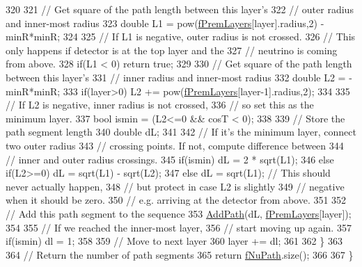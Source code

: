 \begin{DoxyCode}
320   
321     \textcolor{comment}{// Get square of the path length between this layer's }
322     \textcolor{comment}{// outer radius and  inner-most radius}
323     \textcolor{keywordtype}{double} L1 = pow(\hyperlink{classOscProb_1_1PremModel_a19a9a3b23ec154ad7a29f92b74aa5bc6}{fPremLayers}[layer].radius,2) - minR*minR;
324 
325     \textcolor{comment}{// If L1 is negative, outer radius is not crossed.}
326     \textcolor{comment}{// This only happens if detector is at the top layer and the}
327     \textcolor{comment}{// neutrino is coming from above.}
328     \textcolor{keywordflow}{if}(L1 < 0) \textcolor{keywordflow}{return} \textcolor{keyword}{true};
329     
330     \textcolor{comment}{// Get square of the path length between this layer's }
331     \textcolor{comment}{// inner radius and  inner-most radius}
332     \textcolor{keywordtype}{double} L2 = -minR*minR;
333     \textcolor{keywordflow}{if}(layer>0) L2 += pow(\hyperlink{classOscProb_1_1PremModel_a19a9a3b23ec154ad7a29f92b74aa5bc6}{fPremLayers}[layer-1].radius,2);
334     
335     \textcolor{comment}{// If L2 is negative, inner radius is not crossed,}
336     \textcolor{comment}{// so set this as the minimum layer.}
337     \textcolor{keywordtype}{bool} ismin = (L2<=0 && cosT < 0);
338 
339     \textcolor{comment}{// Store the path segment length}
340     \textcolor{keywordtype}{double} dL;
341     
342     \textcolor{comment}{// If it's the minimum layer, connect two outer radius }
343     \textcolor{comment}{// crossing points. If not, compute difference between}
344     \textcolor{comment}{// inner and outer radius crossings.}
345     \textcolor{keywordflow}{if}(ismin)      dL = 2 * sqrt(L1);
346     \textcolor{keywordflow}{else} \textcolor{keywordflow}{if}(L2>=0) dL = sqrt(L1) - sqrt(L2);
347     \textcolor{keywordflow}{else}           dL = sqrt(L1); \textcolor{comment}{// This should never actually happen,}
348                                   \textcolor{comment}{// but protect in case L2 is slightly}
349                                   \textcolor{comment}{// negative when it should be zero.}
350                                   \textcolor{comment}{// e.g. arriving at the detector from above.}
351     
352     \textcolor{comment}{// Add this path segment to the sequence}
353     \hyperlink{classOscProb_1_1PremModel_aca013f7ac5494282834048786a0e07a6}{AddPath}(dL, \hyperlink{classOscProb_1_1PremModel_a19a9a3b23ec154ad7a29f92b74aa5bc6}{fPremLayers}[layer]);
354     
355     \textcolor{comment}{// If we reached the inner-most layer,}
356     \textcolor{comment}{// start moving up again.}
357     \textcolor{keywordflow}{if}(ismin) dl = 1;
358     
359     \textcolor{comment}{// Move to next layer}
360     layer += dl;
361   
362   \}
363 
364   \textcolor{comment}{// Return the number of path segments}
365   \textcolor{keywordflow}{return} \hyperlink{classOscProb_1_1PremModel_aaf3c77e35798d664853157013c90ad2b}{fNuPath}.size();
366 
367 \}
\end{DoxyCode}
